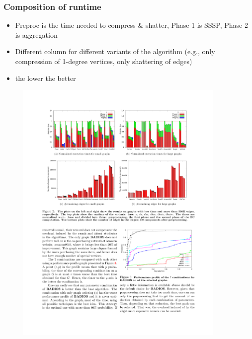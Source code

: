 \begin{frame}
  \frametitle{Composition of runtime}
  \begin{itemize}
    \item Preproc is the time needed to compress \& shatter, Phase 1 is SSSP,
      Phase 2 is aggregation
    \item Different column for different variants of the algorithm (e.g., only
      compression of 1-degree vertices, only shattering of edges)
    \item the lower the better
  \end{itemize}
  \begin{figure}
    \includegraphics[width=0.9\textwidth]{figs/runtimesplitbadios.pdf}
  \end{figure}
\end{frame}


